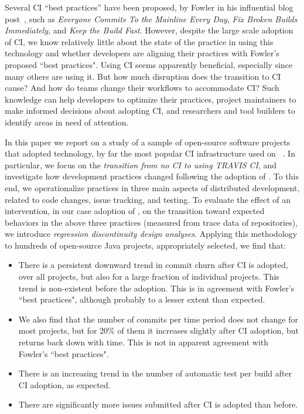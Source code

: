 Several CI ``best practices'' have been proposed, \eg by Fowler in his 
influential blog post~\cite{fowler2000continuous}, such as 
\emph{Everyone Commits To the Mainline Every Day}, 
\emph{Fix Broken Builds Immediately},
and \emph{Keep the Build Fast}.
However, despite the large scale adoption of CI, we know relatively little 
about the state of the practice in using this technology and whether 
developers are aligning their practices with Fowler's proposed ``best practices".
Using CI seems apparently beneficial, especially since many others are using it.
But how much disruption does the transition to CI cause?
And how do teams change their workflows to accommodate CI?
Such knowledge can help developers to optimize their practices, project 
maintainers to make informed decisions about adopting CI, and 
researchers and tool builders to identify areas in need of attention.

In this paper we report on a study of a sample of \GH open-source 
software projects that adopted \Tvis technology, by far the most popular 
CI infrastructure used on \GH~\cite{Hilton2016}.
In particular, we focus on the \emph{transition from no CI to using 
T{\footnotesize RAVIS} CI}, and investigate how development practices 
changed following the adoption of \Tvis.
To this end, we operationalize practices in three main aspects of 
distributed development, related to code changes, issue tracking, 
and testing.
To evaluate the effect of an intervention, in our case adoption of
\Tvis, on the transition toward expected behaviors in the above 
three practices (measured from trace data of \GH repositories),
we introduce \emph{regression discontinuity design analyses}.
Applying this methodology to hundreds of open-source Java 
projects, appropriately selected, we find that:


\begin{itemize}

\item There is a persistent downward trend in commit churn after 
CI is adopted, over all projects, but also for a large fraction of 
individual projects. 
This trend is non-existent before the adoption. 
This is in agreement with Fowler's ``best practices", although 
probably to a lesser extent than expected.

\item We also find that the number of commits per time period does 
not change for most projects, but for 20\% of them it increases slightly 
after CI adoption, but returns back down with time.
This is not in apparent agreement with Fowler's ``best practices".

\item There is an increasing trend in the number of automatic test 
per build after CI adoption, as expected.

\item There are significantly more issues submitted after CI is 
adopted than before.

\end{itemize}


